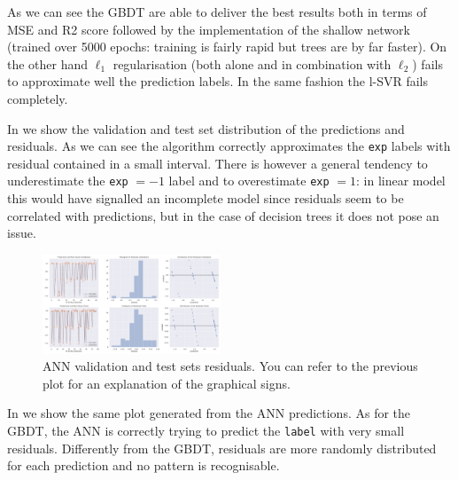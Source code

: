 As we can see the GBDT are able to deliver the best results both in
terms of MSE and R2 score followed by the implementation of the shallow
network (trained over 5000 epochs: training is fairly rapid but trees are by
far faster).
On the other hand $\ell_1$ regularisation (both alone and in combination with
$\ell_2$) fails to approximate well the prediction labels. In the same fashion the
l-SVR fails completely.

In  we show the validation and test set distribution of the
predictions and residuals.
As we can see the algorithm correctly approximates the \texttt{exp} labels with
residual contained in a small interval.
There is however a general tendency to underestimate the \texttt{exp} $= -1$
label and to overestimate \texttt{exp} $= 1$: in linear model this would have
signalled an incomplete model since residuals seem to be correlated with
predictions, but in the case of decision trees it does not pose an issue.

\begin{figure}[htbp]
  \centering
  \includegraphics[width=0.475\textwidth]{img/ann_mod}
  \caption{ANN validation and test sets residuals.
  You can refer to the previous plot for an explanation of the graphical
  signs.}
  \label{fig:ml:ann}
\end{figure}

In  we show the same plot generated from the ANN predictions.
As for the GBDT, the ANN is correctly trying to predict the \texttt{label} with
very small residuals.
Differently from the GBDT, residuals are more randomly distributed for each
prediction and no pattern is recognisable.


